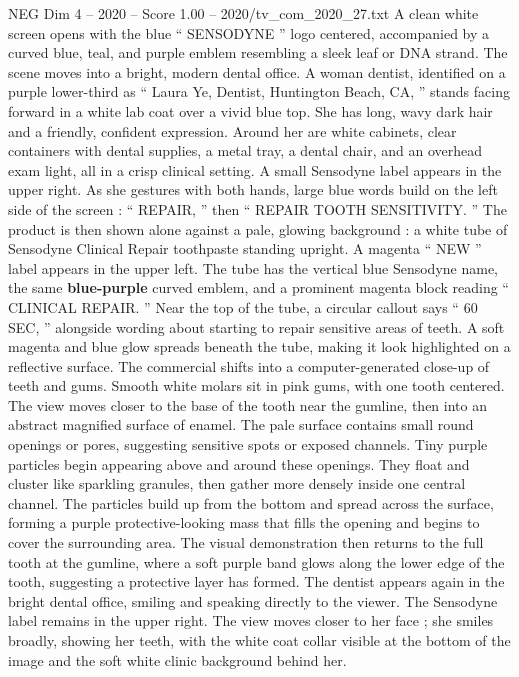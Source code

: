 \begin{textsample}{NEG Dim 4 – 2020 – Score 1.00 – 2020/tv\_com\_2020\_27.txt}  \label{ex:f4_neg_088}
A clean white screen opens with the blue “ SENSODYNE ” logo centered, accompanied by a curved blue, teal, and purple emblem resembling a sleek leaf or DNA strand.
The scene moves into a bright, modern dental office.
A woman dentist, identified on a purple lower-third as “ Laura Ye, Dentist, Huntington Beach, CA, ” stands facing forward in a white lab coat over a vivid blue top.
She has long, wavy dark hair and a friendly, confident expression.
Around her are white cabinets, clear containers with dental supplies, a metal tray, a dental chair, and an overhead exam light, all in a crisp clinical setting.
A small Sensodyne label appears in the upper right.
As she gestures with both hands, large blue words build on the left side of the screen : “ REPAIR, ” then “ REPAIR TOOTH SENSITIVITY. ” The product is then shown alone against a pale, glowing background : a white tube of Sensodyne Clinical Repair toothpaste standing upright.
A magenta “ NEW ” label appears in the upper left.
The tube has the vertical blue Sensodyne name, the same \textbf{blue-purple} curved emblem, and a prominent magenta block reading “ CLINICAL REPAIR. ” Near the top of the tube, a circular callout says “ 60 SEC, ” alongside wording about starting to repair sensitive areas of teeth.
A soft magenta and blue glow spreads beneath the tube, making it look highlighted on a reflective surface.
The commercial shifts into a computer-generated close-up of teeth and gums.
Smooth white molars sit in pink gums, with one tooth centered.
The view moves closer to the base of the tooth near the gumline, then into an abstract magnified surface of enamel.
The pale surface contains small round openings or pores, suggesting sensitive spots or exposed channels.
Tiny purple particles begin appearing above and around these openings.
They float and cluster like sparkling granules, then gather more densely inside one central channel.
The particles build up from the bottom and spread across the surface, forming a purple protective-looking mass that fills the opening and begins to cover the surrounding area.
The visual demonstration then returns to the full tooth at the gumline, where a soft purple band glows along the lower edge of the tooth, suggesting a protective layer has formed.
The dentist appears again in the bright dental office, smiling and speaking directly to the viewer.
The Sensodyne label remains in the upper right.
The view moves closer to her face ; she smiles broadly, showing her teeth, with the white coat collar visible at the bottom of the image and the soft white clinic background behind her.

\end{textsample}
